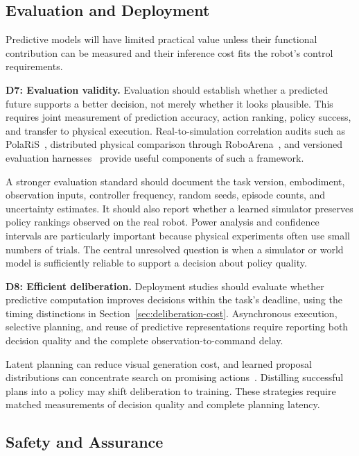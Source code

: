 \documentclass{ieeeaccess}
\begin{document}
\subsection{Evaluation and Deployment}

Predictive models will have limited practical value unless their functional contribution can be measured and their inference cost fits the robot's control requirements.

\noindent\textbf{D7: Evaluation validity.}
Evaluation should establish whether a predicted future supports a better decision, not merely whether it looks plausible. This requires joint measurement of prediction accuracy, action ranking, policy success, and transfer to physical execution. Real-to-simulation correlation audits such as PolaRiS~\cite{polaris}, distributed physical comparison through RoboArena~\cite{roboarena}, and versioned evaluation harnesses~\cite{vlaharness} provide useful components of such a framework.

A stronger evaluation standard should document the task version, embodiment, observation inputs, controller frequency, random seeds, episode counts, and uncertainty estimates. It should also report whether a learned simulator preserves policy rankings observed on the real robot. Power analysis and confidence intervals are particularly important because physical experiments often use small numbers of trials. The central unresolved question is when a simulator or world model is sufficiently reliable to support a decision about policy quality.

\noindent\textbf{D8: Efficient deliberation.}
\textcolor[RGB]{104,48,148}{Deployment studies should evaluate whether predictive computation improves decisions within the task's deadline, using the timing distinctions in Section~\ref{sec:deliberation-cost}. Asynchronous execution, selective planning, and reuse of predictive representations require reporting both decision quality and the complete observation-to-command delay.}

\textcolor[RGB]{104,48,148}{Latent planning can reduce visual generation cost, and learned proposal distributions can concentrate search on promising actions~\cite{tdmpc2}. Distilling successful plans into a policy may shift deliberation to training. These strategies require matched measurements of decision quality and complete planning latency.}

\subsection{Safety and Assurance}
\end{document}
